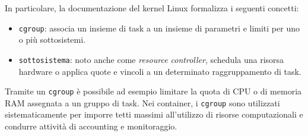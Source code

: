 In particolare, la documentazione del kernel Linux formalizza i seguenti
concetti:

\begin{itemize}
\tightlist
\item
  \passthrough{\lstinline!cgroup!}: associa un insieme di task a un
  insieme di parametri e limiti per uno o più sottosistemi.
\item
  \passthrough{\lstinline!sottosistema!}: noto anche come \emph{resource
  controller}, schedula una risorsa hardware o applica quote e vincoli a
  un determinato raggruppamento di task.
\end{itemize}

Tramite un \passthrough{\lstinline!cgroup!} è possibile ad esempio
limitare la quota di CPU o di memoria RAM assegnata a un gruppo di task.
Nei container, i \passthrough{\lstinline!cgroup!} sono utilizzati
sistematicamente per imporre tetti massimi all'utilizzo di risorse
computazionali e condurre attività di accounting e monitoraggio.

